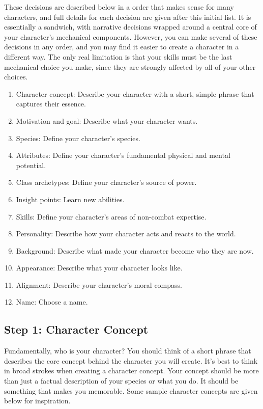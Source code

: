     These decisions are described below in a order that makes sense for many characters, and full details for each decision are given after this initial list.
    It is essentially a sandwich, with narrative decisions wrapped around a central core of your character's mechanical components.
    However, you can make several of these decisions in any order, and you may find it easier to create a character in a different way.
    The only real limitation is that your skills must be the last mechanical choice you make, since they are strongly affected by all of your other choices.

    \begin{enumerate}
        \item Character concept: Describe your character with a short, simple phrase that captures their essence.
        \item Motivation and goal: Describe what your character wants.

        \item Species: Define your character's species.
        \item Attributes: Define your character's fundamental physical and mental potential.
        \item Class archetypes: Define your character's source of power.
        \item Insight points: Learn new abilities.
        \item Skills: Define your character's areas of non-combat expertise.

        \item Personality: Describe how your character acts and reacts to the world.
        \item Background: Describe what made your character become who they are now.
        \item Appearance: Describe what your character looks like.
        \item Alignment: Describe your character's moral compass.
        \item Name: Choose a name.
    \end{enumerate}

    \subsection{Step 1: Character Concept}

        Fundamentally, who is your character?
        You should think of a short phrase that describes the core concept behind the character you will create.
        It's best to think in broad strokes when creating a character concept.
        Your concept should be more than just a factual description of your species or what you do.
        It should be something that makes you memorable.
        Some sample character concepts are given below for inspiration.


